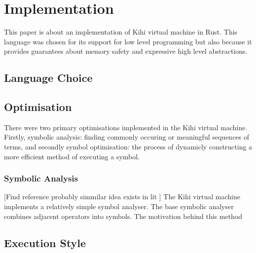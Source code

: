\chapter{Implementation} \label{C:implementation} 

This paper is about an implementation of Kihi virtual machine
in Rust. This language was chosen for its support for low
level programming but also because it provides guarantees about
memory safety and expressive high level abstractions.

\section{Language Choice}

\section{Optimisation}
There were two primary optimisations implemented in the Kihi virtual
machine. Firstly, symbolic analysis: finding commonly occuring or
meaningful sequences of terms, and secondly symbol optimisation: the
process of dynamicly constructing a more efficient method of executing
a symbol. 

\subsection{Symbolic Analysis}
[Find reference probably simmilar idea exists in lit ]
The Kihi virtual machine implements a relatively simple symbol analyser.
The base symbolic analyser combines adjacent operators into symbols. The
motivation behind this method

\section{Execution Style}
